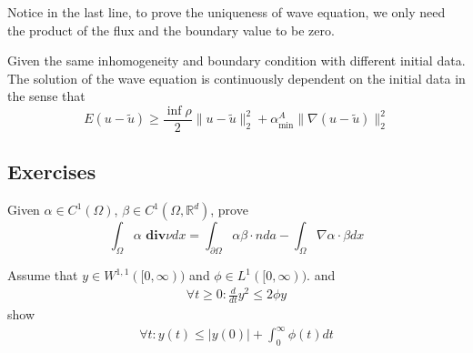 \begin{remark}
Notice in the last line, to prove the uniqueness of wave equation, we only need the product of the flux and the boundary value to be zero. 	
\end{remark}


\begin{corollary}
	Given the same inhomogeneity and boundary condition with different initial data. The solution of the wave equation is continuously dependent on the initial data in the sense that
	\begin{equation}
		E(u - \tilde{u}) \geq \frac{\inf \rho}{2} \|u - \tilde{u}\|_2^2 + \alpha_{\min}^A \|\nabla (u - \tilde{u})\|_2^2
	\end{equation}
\end{corollary}



\subsection{Exercises}
\begin{exercise}
	Given $\alpha \in C^1(\Omega)$, $\beta \in C^1(\Omega, \mathbb{R}^d)$, 
	prove
\begin{equation*}
	\int_\Omega \alpha \textbf{ div}\nu dx = \int_{\partial \Omega} \alpha \beta \cdot n da  -\int_\Omega \nabla \alpha \cdot  \beta dx
\end{equation*}
\end{exercise}

\begin{exercise}
Assume that $y \in W^{1, 1}([0, \infty))$ and $\phi \in L^1([0, \infty))$. and 
\begin{align*}
	\forall t \geq 0: \frac{d}{dt} y^2 \leq 2 \phi y 
\end{align*}
show
\begin{align*}
	\forall t : y(t) \leq |y(0)| + \int_0^\infty \phi(t) dt
\end{align*}
	
\end{exercise}


